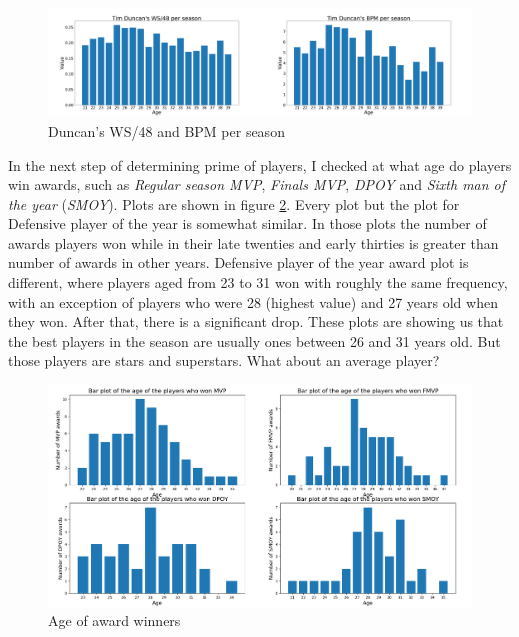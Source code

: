 \documentclass[a4paper]{article}
\begin{document}
\begin{figure}[h!]
\begin{center}
\includegraphics[scale=0.30]{duncan.png}
\end{center}
\caption{Duncan's WS/48 and BPM per season}
\label{plt:duncan}
\end{figure}

In the next step of determining prime of players, I checked at what age do players win awards, such as \textit{Regular season MVP}, \textit{Finals MVP}, \textit{DPOY} and \textit{Sixth man of the year} (\textit{SMOY}). Plots are shown in figure \ref{plt:awards}. Every plot but the plot for Defensive player of the year is somewhat similar. In those plots the number of awards players won while in their late twenties and early thirties is greater than number of awards in other years. Defensive player of the year award plot is different, where players aged from 23 to 31 won with roughly the same frequency, with an exception of players who were 28 (highest value) and 27 years old when they won. After that, there is a significant drop. These plots are showing us that the best players in the season are usually ones between 26 and 31 years old. But those players are stars and superstars. What about an average player?

\begin{figure}[h!]
\begin{center}
\includegraphics[scale=0.3]{awards_plots.png}
\end{center}
\caption{Age of award winners}
\label{plt:awards}
\end{figure}
\end{document}
